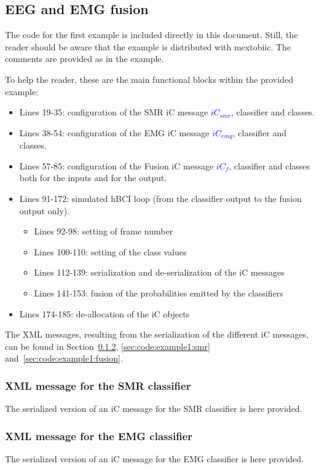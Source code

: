 \documentclass[a4paper,10pt]{article}
\newcommand{\temp}[1]{\textcolor{blue}{\textbf{#1}}}
\begin{document}
\subsection{EEG and EMG fusion}
\label{sec:code:example1}
The code for the first example is included directly in this document. Still, the
reader should be aware that the example is distributed with mextobiic. The
comments are provided as in the example.

To help the reader, these are the main functional blocks within the provided
example:
\begin{itemize}
  \item Lines 19-35: configuration of the SMR iC message \temp{$iC_{smr}$},
  classifier and classes.
  \item Lines 38-54: configuration of the EMG iC message \temp{$iC_{emg}$},
  classifier and classes.  
  \item Lines 57-85: configuration of the Fusion iC message \temp{$iC_{f}$},
  classifier and classes both for the inputs and for the output.
  \item Lines 91-172: simulated hBCI loop (from the classifier output to the
  fusion output only).
  \begin{itemize}
	\item Lines 92-98: setting of frame number
	\item Lines 100-110: setting of the class values
	\item Lines 112-139: serialization and de-serialization of the iC messages
	\item Lines 141-153: fusion of the probabilities emitted by the classifiers
  \end{itemize}
  \item Lines 174-185: de-allocation of the iC objects
\end{itemize}
The XML messages, resulting from the serialization of the different iC messages,
can be found in Section~\ref{sec:code:example1:emg}, \ref{sec:code:example1:smr}
and~\ref{sec:code:example1:fusion}.


\subsubsection{XML message for the SMR classifier}
The serialized version of an iC message for the SMR classifier is here provided.
\label{sec:code:example1:smr}


\subsubsection{XML message for the EMG classifier}
\label{sec:code:example1:emg}
The serialized version of an iC message for the EMG classifier is here provided.

\end{document}
